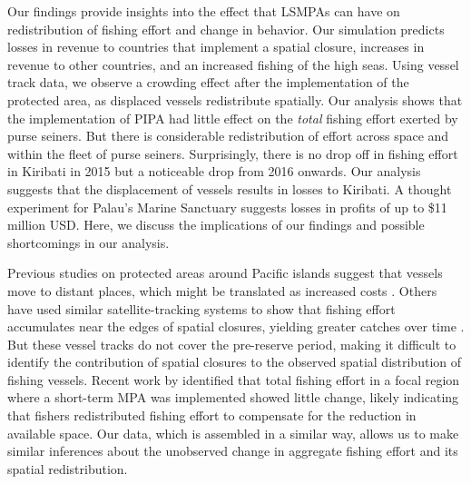 \documentclass[9p,twocolumn,twoside,lineno]{pnas-new}
\begin{document}
Our findings provide insights into the effect that LSMPAs can have on redistribution of fishing effort and change in behavior. Our simulation predicts losses in revenue to countries that implement a spatial closure, increases in revenue to other countries, and an increased fishing of the high seas. Using vessel track data, we observe a crowding effect after the implementation of the protected area, as displaced vessels redistribute spatially. Our analysis shows that the implementation of PIPA had little effect on the \emph{total} fishing effort exerted by purse seiners. 
But there is considerable redistribution of effort across space and within the fleet of purse seiners. Surprisingly, there is no drop off in fishing effort in Kiribati in 2015 but a noticeable drop from 2016 onwards. Our analysis suggests that the displacement of vessels results in losses to Kiribati. A thought experiment for Palau's Marine Sanctuary suggests losses in profits of up to \$11 million USD. Here, we discuss the implications of our findings and possible shortcomings in our analysis.

Previous studies on protected areas around Pacific islands suggest that vessels move to distant places, which might be translated as increased costs \citep{stevenson_2013}. Others have used similar satellite-tracking systems to show that fishing effort accumulates near the edges of spatial closures, yielding greater catches over time \citep{murawski_2005}. But these vessel tracks do not cover the pre-reserve period, making it difficult to identify the contribution of spatial closures to the observed spatial distribution of fishing vessels. Recent work by \cite{elahi_2018} identified that total fishing effort in a focal region where a short-term MPA was implemented showed little change, likely indicating that fishers redistributed fishing effort to compensate for the reduction in available space. Our data, which is assembled in a similar way, allows us to make similar inferences about the unobserved change in aggregate fishing effort and its spatial redistribution.
\end{document}
